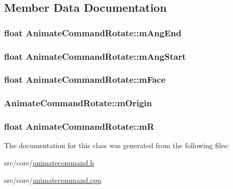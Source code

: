 \subsection{Member Data Documentation}
\hypertarget{a00006_a03d54f905dbfd4927a10e4f9e23fcfb9}{
\subsubsection[{m\-Ang\-End}]{\setlength{\rightskip}{0pt plus 5cm}float Animate\-Command\-Rotate\-::m\-Ang\-End\hspace{0.3cm}{\ttfamily [private]}}}\label{a00006_a03d54f905dbfd4927a10e4f9e23fcfb9}
\hypertarget{a00006_a50c782c031d209ac040c71b0792be40e}{
\subsubsection[{m\-Ang\-Start}]{\setlength{\rightskip}{0pt plus 5cm}float Animate\-Command\-Rotate\-::m\-Ang\-Start\hspace{0.3cm}{\ttfamily [private]}}}\label{a00006_a50c782c031d209ac040c71b0792be40e}
\hypertarget{a00006_aa513da05df7bf1998098c4fc9234a1e5}{
\subsubsection[{m\-Face}]{\setlength{\rightskip}{0pt plus 5cm}float Animate\-Command\-Rotate\-::m\-Face\hspace{0.3cm}{\ttfamily [private]}}}\label{a00006_aa513da05df7bf1998098c4fc9234a1e5}
\hypertarget{a00006_a8dfd55b23f76e9f9987f8ea9e4e3239a}{
\subsubsection[{m\-Origin}]{ Animate\-Command\-Rotate\-::m\-Origin\hspace{0.3cm}{\ttfamily [private]}}}\label{a00006_a8dfd55b23f76e9f9987f8ea9e4e3239a}
\hypertarget{a00006_a1a720ab7b39b95a6a8116308f50b02a8}{
\subsubsection[{m\-R}]{\setlength{\rightskip}{0pt plus 5cm}float Animate\-Command\-Rotate\-::m\-R\hspace{0.3cm}{\ttfamily [private]}}}\label{a00006_a1a720ab7b39b95a6a8116308f50b02a8}


The documentation for this class was generated from the following files\-:\begin{DoxyCompactItemize}
\item 
src/core/\hyperlink{a00198}{animatecommand.\-h}\item 
src/core/\hyperlink{a00197}{animatecommand.\-cpp}\end{DoxyCompactItemize}
